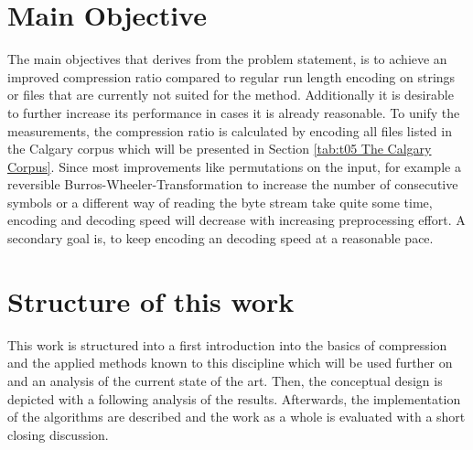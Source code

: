 \section{Main Objective}
\label{ch:Introduction:sec:Main Objective}
\par{
The main objectives that derives from the problem statement, is to achieve an improved compression ratio compared to regular run length encoding on strings or files that are currently not suited for the method. Additionally it is desirable to further increase its performance in cases it is already reasonable. To unify the measurements, the compression ratio is calculated by encoding all files listed in the Calgary corpus which will be presented in Section \ref{tab:t05 The Calgary Corpus}. Since most improvements like permutations on the input, for example a reversible Burros-Wheeler-Transformation to increase the number of consecutive symbols or a different way of reading the byte stream take quite some time, encoding and decoding speed will decrease with increasing preprocessing effort. A secondary goal is, to keep encoding an decoding speed at a reasonable pace.
}
\section{Structure of this work}
\label{ch:Intoduction:sec:Structure}
\par{
This work is structured into a first introduction into the basics of compression and the applied methods known to this discipline which will be used further on and an analysis of the current state of the art. Then, the conceptual design is depicted with a following analysis of the results. Afterwards, the implementation of the algorithms are described and the work as a whole is evaluated with a short closing discussion.  
}
